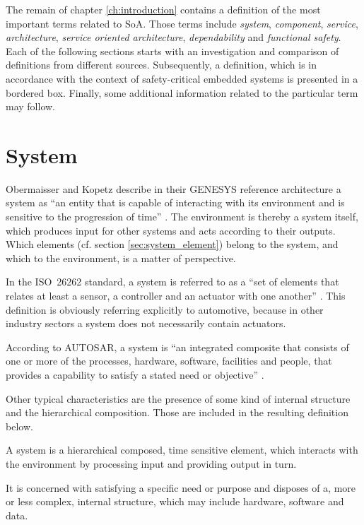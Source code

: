 The remain of chapter \ref{ch:introduction} contains a definition of the most important terms related to SoA. Those terms include \emph{system}, \emph{component}, \emph{service}, \emph{architecture}, \emph{service oriented architecture}, \emph{dependability} and \emph{functional safety}. Each of the following sections starts with an investigation and comparison of definitions from different sources. Subsequently, a definition, which is in accordance with the context of safety-critical embedded systems is presented in a bordered box. Finally, some additional information related to the particular term may follow.






\section{System}
\label{ch:system}
Obermaisser and Kopetz describe in their GENESYS reference architecture a system as ``an entity that is capable of interacting with its environment and is sensitive to the progression of time'' \cite[p.7]{genesys}. The environment is thereby a system itself, which produces input for other systems and acts according to their outputs. Which elements (cf. section \ref{sec:system_element}) belong to the system, and which to the environment, is a matter of perspective. 

In the \mbox{ISO 26262} standard, a system is referred to as a ``set of elements that relates at least a sensor, a controller and an actuator with one another'' \cite{iso26262:1}. This definition is obviously referring explicitly to automotive, because in other industry sectors a system does not necessarily contain actuators.

According to AUTOSAR, a system is ``an integrated composite that consists of one or more of the processes, hardware, software, facilities and people, that provides a capability to satisfy a stated need or objective'' \cite{autosar_glossary}.

Other typical characteristics are the presence of some kind of internal structure and the hierarchical composition. Those are included in the resulting definition below.

\begin{myquote}
A system is a hierarchical composed, time sensitive element, which interacts with the environment by processing input and providing output in turn.

It is concerned with satisfying a specific need or purpose and disposes of a, more or less complex, internal structure, which may include hardware, software and data.
\end{myquote}

